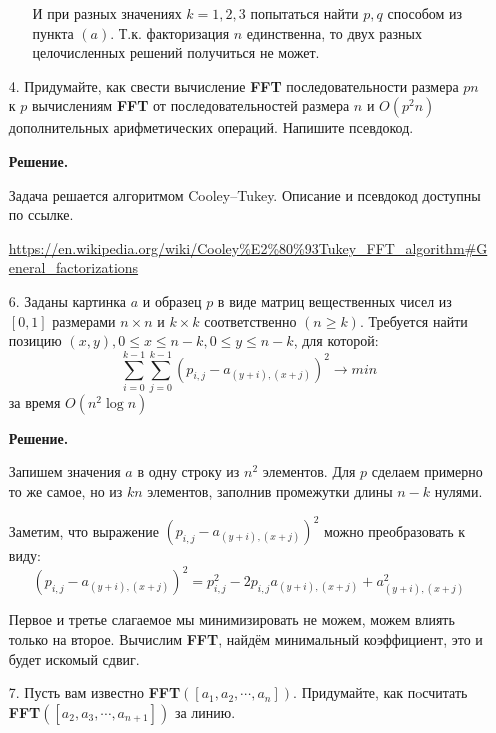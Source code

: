 \begin{enumerate}
\begin{enumerate}
		И при разных значениях $k = 1, 2, 3$ попытаться найти $p,q$ способом из пункта $(a)$. Т.к. факторизация 
		$n$ единственна, то двух разных целочисленных решений получиться не может.
		
	\end{enumerate}
	
	\item[4.] Придумайте, как свести вычисление \textbf{FFT} последовательности размера $pn$ к $p$ вычислениям 
	\textbf{FFT} от	последовательностей размера $n$ и $O(p^2n)$ дополнительных арифметических операций. Напишите 
	псевдокод.
	
	\textbf{Решение.}
	
	Задача решается алгоритмом Cooley–Tukey. Описание и псевдокод доступны по ссылке.
	
	\url{https://en.wikipedia.org/wiki/Cooley%E2%80%93Tukey_FFT_algorithm#General_factorizations}
	
	\item[6.] Заданы картинка $a$ и образец $p$ в виде матриц вещественных чисел из $[0, 1]$ размерами $n \times 
	n$ 
	и $k \times k$ соответственно $(n \geqslant k)$. Требуется найти позицию $(x, y), 0 \leqslant x \leqslant n - 
	k, 0 \leqslant y \leqslant n - k$, для которой:
	\begin{equation*}
		\sum\limits_{i = 0}^{k - 1} \sum\limits_{j = 0}^{k - 1} (p_{i,j} - a_{(y + i), (x + j)})^2 \rightarrow min
	\end{equation*}
	за время $O(n^2\log n)$
	
	\textbf{Решение.}
	
	Запишем значения $a$ в одну строку из $n^2$ элементов. Для $p$ сделаем примерно то же самое, но из $kn$ 
	элементов, заполнив промежутки длины $n - k$ нулями. 
	
	Заметим, что выражение $(p_{i,j} - a_{(y + i), (x + j)})^2$ можно преобразовать к виду:
	\begin{equation*}
		(p_{i,j} - a_{(y + i), (x + j)})^2 = p_{i,j}^2 - 2 p_{i,j}a_{(y + i), (x + j)} + a_{(y + i), (x + j)}^2
	\end{equation*}
	
	Первое и третье слагаемое мы минимизировать не можем, можем влиять только на второе. Вычислим \textbf{FFT}, 
	найдём минимальный коэффициент, это и будет искомый сдвиг.
	
	\item[7.] Пусть вам известно \textbf{FFT}$([a_1, a_2, \cdots , a_n])$. Придумайте, как пoсчитать 
	\textbf{FFT}$([a_2, a_3, \cdots , a_{n+1}])$ за линию.
	

\end{enumerate}

